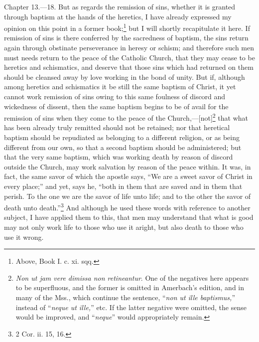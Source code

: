 Chapter 13.—18. But as regards the remission of sins, whether it is granted through baptism at the hands of the heretics, I have already expressed my opinion on this point in a former book;\footnote{\par  Above, Book I. c. xi. sqq.} but I will shortly recapitulate it here. If remission of sins is there conferred by the sacredness of baptism, the sins return again through obstinate perseverance in heresy or schism; and therefore such men must needs return to the peace of the Catholic Church, that they may cease to be heretics and schismatics, and deserve that those sins which had returned on them should be cleansed away by love working in the bond of unity. But if, although among heretics and schismatics it be still the same baptism of Christ, it yet cannot work remission of sins owing to this same foulness of discord and wickedness of dissent, then the same baptism begins to be of avail for the remission of sins when they come to the peace of the Church,—[not]\footnote{\par  \emph{Non ut jam vere dimissa non retineantur}. One of the negatives here appears to be superfluous, and the former is omitted in Amerbach’s edition, and in many of the Mss., which continue the sentence, ``\emph{non ut ille baptismus,}'' instead of ``\emph{neque ut ille,}'' etc. If the latter negative were omitted, the sense would be improved, and ``\emph{neque}'' would appropriately remain.} that what has been already truly remitted should not be retained; nor that heretical baptism should be repudiated as belonging to a different religion, or as being different from our own, so that a second baptism should be administered; but that the very same baptism, which was working death by reason of discord outside the Church, may work salvation by reason of the peace within. It was, in fact, the same savor of which the apostle says, ``We are a sweet savor of Christ in every place;'' and yet, says he, ``both in them that are saved and in them that perish. To the one we are the savor of life unto life; and to the other the savor of death unto death.''\footnote{\par  2 Cor. ii. 15, 16.} And although he used these words with reference to another subject, I have applied them to this, that men may understand that what is good may not only work life to those who use it aright, but also death to those who use it wrong.


